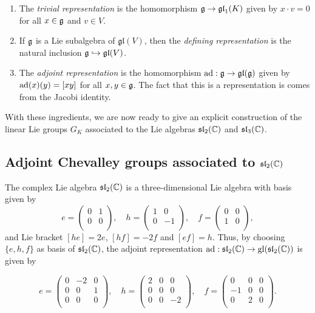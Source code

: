 \begin{example}
    \begin{enumerate}
        \item The \textit{trivial representation} is the homomorphism $\mathfrak{g}\to\mathfrak{gl}_1(K)$ given by $x\cdot v=0$ for all $x\in\mathfrak{g}$ and $v\in V$.
        \item If $\mathfrak{g}$ is a Lie subalgebra of $\mathfrak{gl}(V)$, then the \textit{defining representation} is the natural inclusion $\mathfrak{g}\hookrightarrow\mathfrak{gl}(V)$.
        \item The \textit{adjoint representation} is the homomorphism $\mathrm{ad}:\mathfrak{g}\to\mathfrak{gl}(\mathfrak{g})$ given by $\mathrm{ad}(x)(y)=[xy]$ for all $x,y\in\mathfrak{g}$. The fact that this is a representation is comes from the Jacobi identity.
    \end{enumerate}
\end{example}

With these ingredients, we are now ready to give an explicit construction of the linear Lie groups $G_K$ associated to the Lie algebras $\mathfrak{sl}_2(\mathbb{C})$ and $\mathfrak{sl}_3(\mathbb{C})$.

\subsection{Adjoint Chevalley groups associated to \texorpdfstring{$\mathfrak{sl}_2(\mathbb{C})$}{PDFstring}}
The complex Lie algebra $\mathfrak{sl}_2(\mathbb{C})$ is a three-dimensional Lie algebra with basis given by
$$e=\begin{pmatrix}
    0 & 1\\
    0 & 0\\
\end{pmatrix},\quad h=\begin{pmatrix}
    1 & 0\\
    0 & -1\\
\end{pmatrix},\quad f=\begin{pmatrix}
    0 & 0\\
    1 & 0\\
\end{pmatrix},$$
and Lie bracket $[he]=2e$, $[hf]=-2f$ and $[ef]=h$. Thus, by choosing $\{e,h,f\}$ as basis of $\mathfrak{sl}_2(\mathbb{C})$, the adjoint representation $\mathrm{ad}:\mathfrak{sl}_2(\mathbb{C})\to\mathrm{gl}(\mathfrak{sl}_2(\mathbb{C}))$ is given by 

$$e=\begin{pmatrix}
    0 & -2 & 0\\
    0 & 0 & 1\\
    0 & 0 & 0\\
\end{pmatrix},\quad h=\begin{pmatrix}
    2 & 0 & 0\\
    0 & 0 & 0\\
    0 & 0 & -2\\
\end{pmatrix},\quad f=\begin{pmatrix}
    0 & 0 & 0\\
    -1 & 0 & 0\\
    0 & 2 & 0\\
\end{pmatrix}.$$

